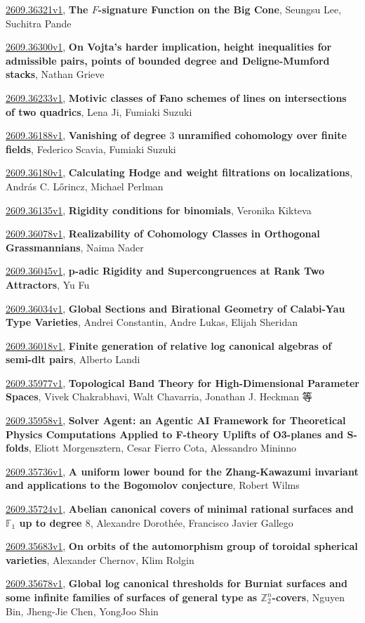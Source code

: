 \documentclass[9pt, a4paper]{article}
\theoremstyle{plain}
\theoremstyle{definition}
\theoremstyle{remark}
\newcommand{\arxiv}[3]{\href{https://arxiv.org/abs/#1}{#1}, \textbf{\textcolor{arxivblue}{#2}}, #3}
\begin{document}
\arxiv{2609.36321v1}{The $F$-signature Function on the Big Cone}{Seungsu Lee, Suchitra Pande}

\arxiv{2609.36300v1}{On Vojta's harder implication, height inequalities for admissible pairs, points of bounded degree and Deligne-Mumford stacks}{Nathan Grieve}

\arxiv{2609.36233v1}{Motivic classes of Fano schemes of lines on intersections of two quadrics}{Lena Ji, Fumiaki Suzuki}

\arxiv{2609.36188v1}{Vanishing of degree $3$ unramified cohomology over finite fields}{Federico Scavia, Fumiaki Suzuki}

\arxiv{2609.36180v1}{Calculating Hodge and weight filtrations on localizations}{András C. Lőrincz, Michael Perlman}

\arxiv{2609.36135v1}{Rigidity conditions for binomials}{Veronika Kikteva}

\arxiv{2609.36078v1}{Realizability of Cohomology Classes in Orthogonal Grassmannians}{Naima Nader}

\arxiv{2609.36045v1}{p-adic Rigidity and Supercongruences at Rank Two Attractors}{Yu Fu}

\arxiv{2609.36034v1}{Global Sections and Birational Geometry of Calabi-Yau Type Varieties}{Andrei Constantin, Andre Lukas, Elijah Sheridan}

\arxiv{2609.36018v1}{Finite generation of relative log canonical algebras of semi-dlt pairs}{Alberto Landi}

\arxiv{2609.35977v1}{Topological Band Theory for High-Dimensional Parameter Spaces}{Vivek Chakrabhavi, Walt Chavarria, Jonathan J. Heckman 等}

\arxiv{2609.35958v1}{Solver Agent: an Agentic AI Framework for Theoretical Physics Computations Applied to F-theory Uplifts of O3-planes and S-folds}{Eliott Morgensztern, Cesar Fierro Cota, Alessandro Mininno}

\arxiv{2609.35736v1}{A uniform lower bound for the Zhang-Kawazumi invariant and applications to the Bogomolov conjecture}{Robert Wilms}

\arxiv{2609.35724v1}{Abelian canonical covers of minimal rational surfaces and $\mathbb F_1$ up to degree $8$}{Alexandre Dorothée, Francisco Javier Gallego}

\arxiv{2609.35683v1}{On orbits of the automorphism group of toroidal spherical varieties}{Alexander Chernov, Klim Rolgin}

\arxiv{2609.35678v1}{Global log canonical thresholds for Burniat surfaces and some infinite families of surfaces of general type as $\mathbb{Z}_2^n$-covers}{Nguyen Bin, Jheng-Jie Chen, YongJoo Shin}
\end{document}
